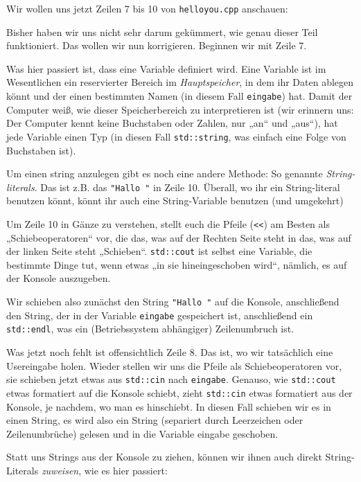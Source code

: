 
Wir wollen uns jetzt Zeilen 7 bis 10 von \texttt{helloyou.cpp} anschauen:

Bisher haben wir uns nicht sehr darum gekümmert, wie genau dieser Teil
funktioniert. Das wollen wir nun korrigieren. Beginnen wir mit Zeile 7.

Was hier passiert ist, dass eine Variable definiert wird. Eine Variable ist im
Wesentlichen ein reservierter Bereich im \emph{Hauptspeicher}, in dem ihr Daten
ablegen könnt und der einen bestimmten Namen (in diesem Fall \texttt{eingabe})
hat. Damit der Computer weiß, wie dieser Speicherbereich zu interpretieren ist
(wir erinnern uns: Der Computer kennt keine Buchstaben oder Zahlen, nur „an“
und „aus“), hat jede Variable einen Typ (in diesen Fall \texttt{std::string},
was einfach eine Folge von Buchstaben ist).

Um einen string anzulegen gibt es noch eine andere Methode: So genannte
\emph{String-literals}. Das ist z.B. das \verb|"Hallo "| in Zeile 10.
Überall, wo ihr ein String-literal benutzen könnt, könnt ihr auch eine
String-Variable benutzen (und umgekehrt)

Um Zeile 10 in Gänze zu verstehen, stellt euch die Pfeile (\verb|<<|) am Besten
als „Schiebeoperatoren“ vor, die das, was auf der Rechten Seite steht in das,
was auf der linken Seite steht „Schieben“. \texttt{std::cout} ist selbst eine
Variable, die bestimmte Dinge tut, wenn etwas „in sie hineingeschoben wird“,
nämlich, es auf der Konsole auszugeben.

Wir schieben also zunächst den String \verb|"Hallo "| auf die Konsole,
anschließend den String, der in der Variable \texttt{eingabe} gespeichert ist,
anschließend ein \texttt{std::endl}, was ein (Betriebssystem abhängiger)
Zeilenumbruch ist.

Was jetzt noch fehlt ist offensichtlich Zeile 8. Das ist, wo wir tatsächlich
eine Usereingabe holen. Wieder stellen wir uns die Pfeile als Schiebeoperatoren
vor, sie schieben jetzt etwas aus \texttt{std::cin} nach \texttt{eingabe}.
Genauso, wie \texttt{std::cout} etwas formatiert auf die Konsole schiebt, zieht
\texttt{std::cin} etwas formatiert aus der Konsole, je nachdem, wo man es
hinschiebt. In diesen Fall schieben wir es in einen String, es wird also ein
String (separiert durch Leerzeichen oder Zeilenumbrüche) gelesen und in die
Variable eingabe geschoben.

Statt uns Strings aus der Konsole zu ziehen, können wir ihnen auch direkt
String-Literals \emph{zuweisen}, wie es hier passiert:

